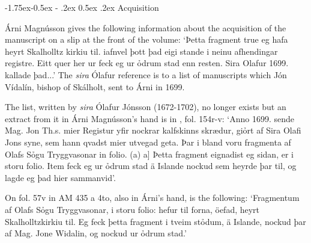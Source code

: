 \documentclass[11pt,twoside]{article}\makeatletter
\makeatletter
\renewcommand\subsection{\@startsection{subsection}{2}{\z@}%
     {-1.75ex\@plus -0.5ex \@minus- .2ex}%
     {0.5ex \@plus .2ex}%
     {\reset@font\Large\sffamily}}
\makeatother
\begin{document}
\subsection{Acquisition}
\par
Árni Magnússon gives the following information about the acquisition of the manuscript on a slip at the front of the volume: ‘Þetta fragment true eg hafa {\hskip1pt}\newline  heyrt Skalholltz kirkiu til. {\hskip1pt}\newline  iafnvel þott þad eigi stande {\hskip1pt}\newline  i neinu afhendingar registre. {\hskip1pt}\newline  Eitt quer her ur feck eg ur ỏd{\hskip1pt}\newline rum stad enn resten. {\hskip1pt}\newline  Sira Olafur 1699. kallade þad...’ The \textit{sira} Ólafur reference is to a list of manuscripts which Jón Vídalín, bishop of Skálholt, sent to Árni in 1699. \par
The list, written by \textit{sira} Ólafur Jónsson (1672-1702), no longer exists but an extract from it in Árni Magnússon's hand is in , fol. 154r-v: ‘Anno 1699. sende Mag. Jon Th.s. {\hskip1pt}\newline  mier Registur yfir nockrar kalf{\hskip1pt}\newline skinns skrædur, giỏrt af Sira Olafi Jons {\hskip1pt}\newline  syne, sem hann qvadst mier ut{\hskip1pt}\newline vegad geta. Þar i bland voru {\hskip1pt}\newline  fragmenta af Olafs Sỏgu Tryggva{\hskip1pt}\newline sonar in folio. (a)  a] Þetta fragment eignadist eg sidan, er i {\hskip1pt}\newline  storu folio. Item feck eg ur ỏdrum {\hskip1pt}\newline  stad ä Islande nockud sem heyrde þar {\hskip1pt}\newline  til, og lagde eg þad hier sammanvid’. \par
On fol. 57v in AM 435 a 4to, also in Árni's hand, is the following: ‘Fragmentum af Olafs Sỏgu Tryggvasonar, i storu folio: hefur til forna, öefad, heyrt Skalholltzkirkiu til. Eg feck þetta fragment i tveim stỏdum, ä Islande, nockud þar af Mag. Jone Widalin, og nockud ur ỏdrum stad.’ \par
\end{document}
